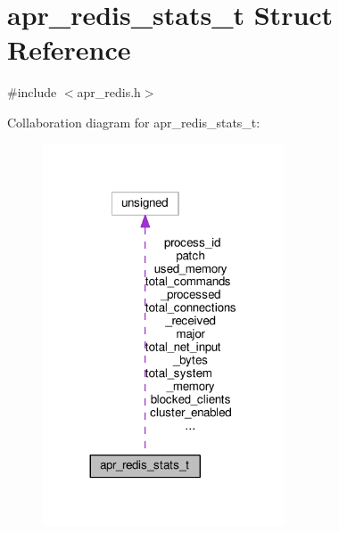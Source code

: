 \hypertarget{structapr__redis__stats__t}{}\section{apr\+\_\+redis\+\_\+stats\+\_\+t Struct Reference}
\label{structapr__redis__stats__t}


{\ttfamily \#include $<$apr\+\_\+redis.\+h$>$}



Collaboration diagram for apr\+\_\+redis\+\_\+stats\+\_\+t\+:
\nopagebreak
\begin{figure}[H]
\begin{center}
\leavevmode
\includegraphics[width=203pt]{structapr__redis__stats__t__coll__graph}
\end{center}
\end{figure}
